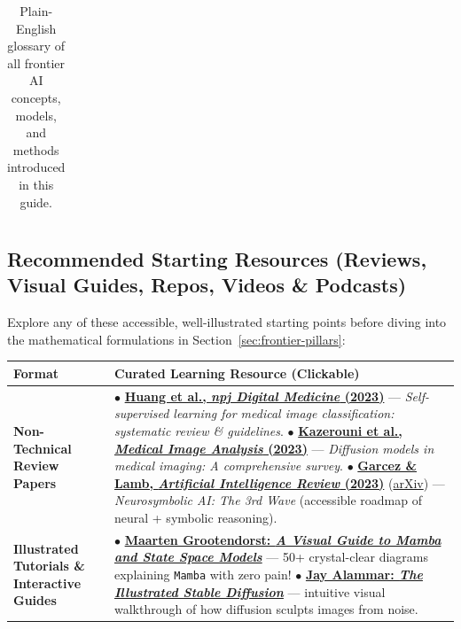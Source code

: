 \documentclass[10.5pt,a4paper]{article}
\begin{document}
\begin{table}[H]
\begin{tabularx}{\textwidth}{L{3.55cm} Y}
\bottomrule
\end{tabularx}
\caption{Plain-English glossary of all frontier AI concepts, models, and methods introduced in this guide.}
\label{tab:nontech-frontier-defs}
\end{table}

\newpage
\subsection{Recommended Starting Resources (Reviews, Visual Guides, Repos, Videos \& Podcasts)}

Explore any of these accessible, well-illustrated starting points before diving into the mathematical formulations in Section~\ref{sec:frontier-pillars}:

\begin{table}[H]
\centering
\scriptsize
\renewcommand{\arraystretch}{1.22}
\begin{tabularx}{\textwidth}{L{2.55cm} Y}
\toprule
{}
\textbf{Format} & \textbf{Curated Learning Resource (Clickable)} \\
\midrule
\textbf{Non-Technical Review Papers} &
$\bullet$ \href{https://doi.org/10.1038/s41746-023-00811-0}{\textbf{Huang et al., \emph{npj Digital Medicine} (2023)}} --- \emph{Self-supervised learning for medical image classification: systematic review \& guidelines}. \newline
$\bullet$ \href{https://doi.org/10.1016/j.media.2023.102846}{\textbf{Kazerouni et al., \emph{Medical Image Analysis} (2023)}} --- \emph{Diffusion models in medical imaging: A comprehensive survey}. \newline
$\bullet$ \href{https://link.springer.com/article/10.1007/s10462-023-10448-w}{\textbf{Garcez \& Lamb, \emph{Artificial Intelligence Review} (2023)}} (\href{https://arxiv.org/abs/2012.05876}{arXiv}) --- \emph{Neurosymbolic AI: The 3rd Wave} (accessible roadmap of neural + symbolic reasoning). \\
\textbf{Illustrated Tutorials \& Interactive Guides} &
$\bullet$ \href{https://newsletter.maartengrootendorst.com/p/a-visual-guide-to-mamba-and-state}{\textbf{Maarten Grootendorst: \emph{A Visual Guide to Mamba and State Space Models}}} --- 50+ crystal-clear diagrams explaining \texttt{Mamba} with zero pain! \newline
$\bullet$ \href{https://jalammar.github.io/illustrated-stable-diffusion/}{\textbf{Jay Alammar: \emph{The Illustrated Stable Diffusion}}} --- intuitive visual walkthrough of how diffusion sculpts images from noise. \newline

\end{tabularx}
\end{table}
\end{document}
